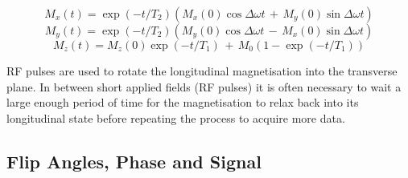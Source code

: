 
\begin{equation}
    M_{x}(t) = \exp(-t/T_2) \left( M_{x}(0)\cos\Delta\omega t \, + \, M_{y}(0)\sin\Delta\omega t \right)
    \label{eqn:theory:xprime}
\end{equation}
\begin{equation}
    M_{y}(t) = \exp(-t/T_2) \left( M_{y}(0)\cos\Delta\omega t \, - \, M_{x}(0)\sin\Delta\omega t \right)
\end{equation}
\begin{equation}
    M_z(t) = M_z(0)\exp(-t/T_1) \, + \, M_0 \left( 1-\exp(-t/T_1) \right)
    \label{eqn:theory:zprime}
\end{equation}

RF pulses are used to rotate the longitudinal magnetisation into the transverse plane. In between short applied fields (\ac{RF} pulses) it is often necessary to wait a large enough period of time for the magnetisation to relax back into its longitudinal state before repeating the process to acquire more data. 


\subsection{Flip Angles, Phase and Signal}

